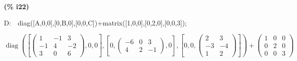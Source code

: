 \documentclass[fleqn]{article}
\begin{document}
\noindent
\begin{minipage}[t]{4.000000em}\color{red}\bfseries
(\% i22)	
\end{minipage}
\begin{minipage}[t]{\textwidth}\color{blue}
D:\ \ diag([A,0,0],[0,B,0],[0,0,C])+matrix([1,0,0],[0,2,0],[0,0,3]);
\end{minipage}
\[\displaystyle \tag{D} 
\mathop{diag}\left( \left[ \begin{pmatrix}1 & \mathop{-}1 & 3\\
\mathop{-}1 & 4 & \mathop{-}2\\
3 & 0 & 6\end{pmatrix}\mathop{,}0\mathop{,}0\right] \mathop{,}\left[ 0\mathop{,}\begin{pmatrix}\mathop{-}6 & 0 & 3\\
4 & 2 & \mathop{-}1\end{pmatrix}\mathop{,}0\right] \mathop{,}\left[ 0\mathop{,}0\mathop{,}\begin{pmatrix}2 & 3\\
\mathop{-}3 & \mathop{-}4\\
1 & 2\end{pmatrix}\right] \right) \mathop{+}\begin{pmatrix}1 & 0 & 0\\
0 & 2 & 0\\
0 & 0 & 3\end{pmatrix}\mbox{}
\]
\end{document}

